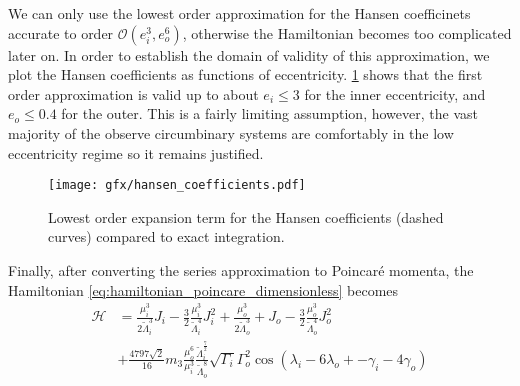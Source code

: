 \documentclass[ twoside,openright,titlepage,numbers=noenddot,headinclude,%
                footinclude=true,cleardoublepage=empty,abstractoff, %
                BCOR=5mm,paper=a4,fontsize=11pt,%
                american,%
                ]{scrreprt}
\begin{document}
We can only use the lowest order approximation for the Hansen coefficinets
accurate to order 
$\mathcal{O}(e_i^3,e_o^6)$, otherwise the Hamiltonian becomes too complicated
later on. In order to establish the domain of validity of this approximation,
we plot the Hansen coefficients as functions of eccentricity.
\cref{fig:hansen_coefficients} shows that the first order approximation is 
valid up to about $e_i\leq 3$ for the inner eccentricity, and $e_o\leq 0.4$
for the outer. This is a fairly limiting assumption, however, the vast majority
of the observe circumbinary systems are comfortably in the low eccentricity
regime so it remains justified.
\begin{figure}[htb]
\centering
\texttt{[image: gfx/hansen\_coefficients.pdf]}
    \caption{Lowest order expansion term for the Hansen coefficients (dashed curves) 
    compared to exact integration.}
\label{fig:hansen_coefficients}
\end{figure}
Finally, after converting the series approximation to Poincaré momenta, the 
Hamiltonian \ref{eq:hamiltonian_poincare_dimensionless} becomes
\begin{equation}
    \begin{aligned}
        \mathcal{H}&=\frac{\mu_i^3}{2\tilde{\Lambda}_i^3}
        J_i - \frac{3}{2}
        \frac{\mu_i^3}{\tilde{\Lambda}_i^4} J_i^2+
    \frac{\mu_o^3}{2\tilde{\Lambda}_o^3}+
        J_o - \frac{3}{2}
        \frac{\mu_o^3}{\tilde{\Lambda}_o^4} J_o^2\\
        &+\frac{4797\sqrt{2}}{16}m_3 \frac{\mu_o^6}{\mu_i^3} 
        \frac{\tilde{\Lambda}_i^{ \frac{7}{2} }}
        {\tilde{\Lambda}_o^8}\sqrt{\Gamma_i}\Gamma_o^2
    \cos(\lambda_i-6\lambda_o+
    -\gamma_i - 4\gamma_o)
    \end{aligned}
    \label{eq:hamiltonian_poincare_dimensionless_expand}
\end{equation}
\end{document}
